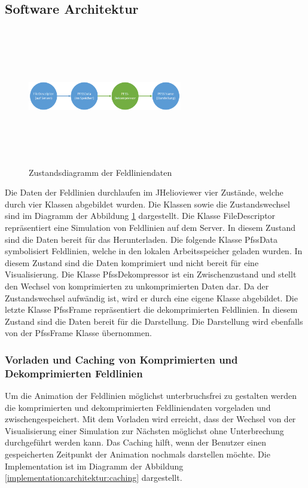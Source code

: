 \subsection{Software Architektur}
\begin{figure}[!htbp]
	\center
	\includegraphics[width=0.6\textwidth,height=6cm,keepaspectratio]{./pictures/implementation/dataflow.png}
	\caption{Zustandsdiagramm der Feldliniendaten}
	\label{implementation:architektur:datenfluss}
\end{figure}
Die Daten der Feldlinien durchlaufen im JHelioviewer vier Zustände, welche durch vier Klassen abgebildet wurden. Die Klassen sowie die Zustandswechsel sind im Diagramm der Abbildung \ref{implementation:architektur:datenfluss} dargestellt. Die Klasse FileDescriptor repräsentiert eine Simulation von Feldlinien auf dem Server. In diesem Zustand sind die Daten bereit für das Herunterladen. Die folgende Klasse PfssData symbolisiert Feldlinien, welche in den lokalen Arbeitsspeicher geladen wurden. In diesem Zustand sind die Daten komprimiert und nicht bereit für eine Visualisierung. Die Klasse PfssDekompressor ist ein Zwischenzustand und stellt den Wechsel von komprimierten zu unkomprimierten Daten dar. Da der Zustandswechsel aufwändig ist, wird er durch eine eigene Klasse abgebildet. Die letzte Klasse PfssFrame repräsentiert die dekomprimierten Feldlinien. In diesem Zustand sind die Daten bereit für die Darstellung. Die Darstellung wird ebenfalls von der PfssFrame Klasse übernommen.

\subsubsection{Vorladen und Caching von Komprimierten und Dekomprimierten Feldlinien}
Um die Animation der Feldlinien möglichst unterbruchsfrei zu gestalten werden die komprimierten und dekomprimierten Feldliniendaten vorgeladen und zwischengespeichert. Mit dem Vorladen wird erreicht, dass der Wechsel von der Visualisierung einer Simulation zur Nächsten möglichst ohne Unterbrechung durchgeführt werden kann. Das Caching hilft, wenn der Benutzer einen gespeicherten Zeitpunkt der Animation nochmals darstellen möchte. Die Implementation ist im Diagramm der Abbildung \ref{implementation:architektur:caching} dargestellt.

